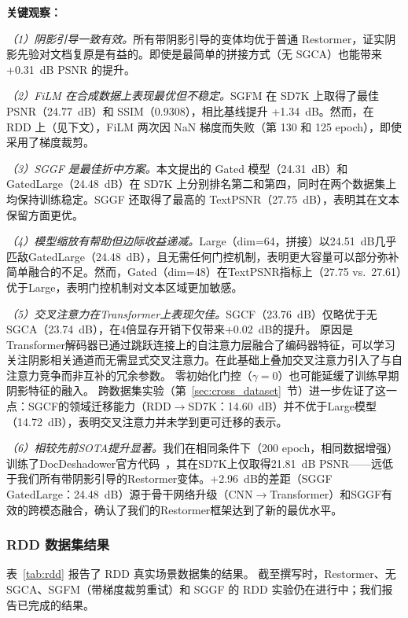\documentclass[11pt]{ctexart}
\begin{document}
\textbf{关键观察：}

\textit{（1）阴影引导一致有效。}所有带阴影引导的变体均优于普通 Restormer，证实阴影先验对文档复原是有益的。即使是最简单的拼接方式（无 SGCA）也能带来 +0.31~dB PSNR 的提升。

\textit{（2）FiLM 在合成数据上表现最优但不稳定。}SGFM 在 SD7K 上取得了最佳 PSNR（24.77~dB）和 SSIM（0.9308），相比基线提升 +1.34~dB。然而，在 RDD 上（见下文），FiLM 两次因 NaN 梯度而失败（第 130 和 125 epoch），即使采用了梯度裁剪。

\textit{（3）SGGF 是最佳折中方案。}本文提出的 Gated 模型（24.31~dB）和 GatedLarge（24.48~dB）在 SD7K 上分别排名第二和第四，同时在两个数据集上均保持训练稳定。SGGF 还取得了最高的 TextPSNR（27.75~dB），表明其在文本保留方面更优。

\textit{（4）模型缩放有帮助但边际收益递减。}Large（dim=64，拼接）以24.51~dB几乎匹敌GatedLarge（24.48~dB），且无需任何门控机制，表明更大容量可以部分弥补简单融合的不足。然而，Gated（dim=48）在TextPSNR指标上（27.75 vs.~27.61）优于Large，表明门控机制对文本区域更加敏感。

\textit{（5）交叉注意力在Transformer上表现欠佳。}SGCF（23.76~dB）仅略优于无SGCA（23.74~dB），在4倍显存开销下仅带来+0.02~dB的提升。
原因是Transformer解码器已通过跳跃连接上的自注意力层融合了编码器特征，可以学习关注阴影相关通道而无需显式交叉注意力。在此基础上叠加交叉注意力引入了与自注意力竞争而非互补的冗余参数。
零初始化门控（$\gamma=0$）也可能延缓了训练早期阴影特征的融入。
跨数据集实验（第~\ref{sec:cross_dataset}~节）进一步佐证了这一点：SGCF的领域迁移能力（RDD$\rightarrow$SD7K：14.60~dB）并不优于Large模型（14.72~dB），表明交叉注意力并未学到更可迁移的表示。

\textit{（6）相较先前SOTA提升显著。}我们在相同条件下（200 epoch，相同数据增强）训练了DocDeshadower官方代码~\cite{li2023single}，其在SD7K上仅取得21.81~dB PSNR——远低于我们所有带阴影引导的Restormer变体。+2.96~dB的差距（SGGF GatedLarge：24.48~dB）源于骨干网络升级（CNN$\rightarrow$Transformer）和SGGF有效的跨模态融合，确认了我们的Restormer框架达到了新的最优水平。

\subsubsection{RDD 数据集结果}

表~\ref{tab:rdd} 报告了 RDD 真实场景数据集的结果。
截至撰写时，Restormer、无 SGCA、SGFM（带梯度裁剪重试）和 SGGF 的 RDD 实验仍在进行中；我们报告已完成的结果。
\end{document}
